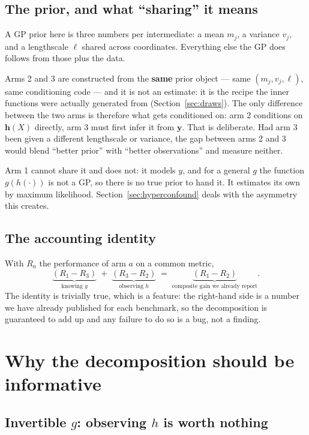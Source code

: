 \documentclass[11pt]{article}
\begin{document}
\subsection{The prior, and what ``sharing'' it means}

A GP prior here is three numbers per intermediate: a mean $m_j$, a variance
$v_j$, and a lengthscale $\ell$ shared across coordinates. Everything else the
GP does follows from those plus the data.

Arms 2 and 3 are constructed from the \textbf{same} prior object --- same
$(m_j,v_j,\ell)$, same conditioning code --- and it is not an estimate: it is
the recipe the inner functions were actually generated from
(Section~\ref{sec:draws}). The only difference between the two arms is therefore
what gets conditioned on: arm 2 conditions on $\mathbf{h}(X)$ directly, arm 3
must first infer it from $\mathbf{y}$. That is deliberate. Had arm 3 been given
a different lengthscale or variance, the gap between arms 2 and 3 would blend
``better prior'' with ``better observations'' and measure neither.

Arm 1 cannot share it and does not: it models $y$, and for a general $g$ the
function $g(h(\cdot))$ is not a GP, so there is no true prior to hand it. It
estimates its own by maximum likelihood. Section~\ref{sec:hyperconfound} deals
with the asymmetry this creates.

\subsection{The accounting identity}

With $R_a$ the performance of arm $a$ on a common metric,
\begin{equation}
\underbrace{(R_1-R_3)}_{\text{knowing }g}\;+\;\underbrace{(R_3-R_2)}_{\text{observing }h}
\;=\;\underbrace{(R_1-R_2)}_{\text{composite gain we already report}} .
\end{equation}
The identity is trivially true, which is a feature: the right-hand side is a
number we have already published for each benchmark, so the decomposition is
guaranteed to add up and any failure to do so is a bug, not a finding.

\section{Why the decomposition should be informative}

\subsection{Invertible $g$: observing $h$ is worth nothing}
\end{document}
